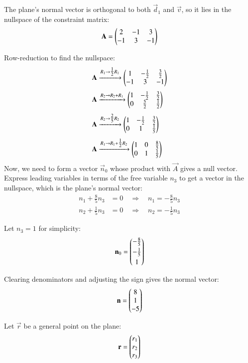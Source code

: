 \documentclass[journal]{IEEEtran}
\begin{document}
\noindent The plane's normal vector is orthogonal to both \(\vec{d}_1\) and \(\vec{v}\), so it lies in the nullspace of the constraint matrix:
\begin{align}
\mathbf{A} = \begin{pmatrix}2 & -1 & 3 \\ -1 & 3 & -1\end{pmatrix}
\end{align}

\noindent Row-reduction to find the nullspace:
\begin{align}
\mathbf{A} &\xrightarrow{R_1 \to \tfrac{1}{2}R_1} \begin{pmatrix}1 & -\tfrac{1}{2} & \tfrac{3}{2} \\ -1 & 3 & -1\end{pmatrix} \\[1mm]
\mathbf{A} &\xrightarrow{R_2 \to R_2 + R_1} \begin{pmatrix}1 & -\tfrac{1}{2} & \tfrac{3}{2} \\ 0 & \tfrac{5}{2} & \tfrac{1}{2}\end{pmatrix} \\[1mm]
\mathbf{A} &\xrightarrow{R_2 \to \tfrac{2}{5}R_2} \begin{pmatrix}1 & -\tfrac{1}{2} & \tfrac{3}{2} \\ 0 & 1 & \tfrac{1}{5}\end{pmatrix} \\[1mm]
\mathbf{A} &\xrightarrow{R_1 \to R_1 + \tfrac{1}{2}R_2} \begin{pmatrix}1 & 0 & \tfrac{8}{5} \\ 0 & 1 & \tfrac{1}{5}\end{pmatrix}
\end{align}
Now, we need to form a vector $\vec{n}_0$ whose product with $\vec{A}$ gives a null vector.\\
\noindent Express leading variables in terms of the free variable \(n_3\) to get a vector in the nullspace, which is the plane's normal vector:
\begin{align}
n_1 + \frac{8}{5} n_3 &= 0 \quad \Rightarrow \quad n_1 = -\frac{8}{5} n_3 \\
n_2 + \frac{1}{5} n_3 &= 0 \quad \Rightarrow \quad n_2 = -\frac{1}{5} n_3
\end{align}

\noindent Let \(n_3 = 1\) for simplicity:
\begin{align}
\mathbf{n}_0 = \begin{pmatrix}-\frac{8}{5} \\[1mm] -\frac{1}{5} \\[1mm] 1\end{pmatrix}
\end{align}

\noindent Clearing denominators and adjusting the sign gives the normal vector:
\begin{align}
\mathbf{n} = \begin{pmatrix}8\\1\\-5\end{pmatrix}
\end{align}

\noindent Let \(\vec{r}\) be a general point on the plane:
\begin{align}
\mathbf{r} = \begin{pmatrix}r_1\\ r_2\\ r_3\end{pmatrix}
\end{align}
\end{document}
